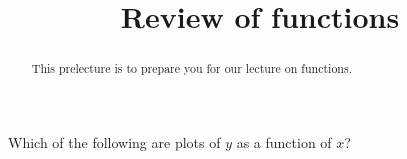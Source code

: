 \documentclass{ximera}
\title{Review of functions}
\begin{document}
\begin{abstract}
This prelecture is to prepare you for our lecture on functions.
\end{abstract}
\maketitle

\begin{question}
Which of the following are plots of $y$ as a function of $x$?

\begin{solution}
  \begin{multiple-choice}

\end{multiple-choice}
\end{solution}
\end{question}
\end{document}
